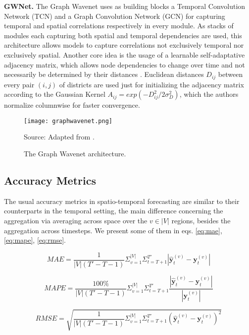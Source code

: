 \noindent
\textbf{GWNet.} The Graph Wavenet uses as building blocks a Temporal Convolution Network (TCN) and a Graph Convolution Network (GCN) for capturing temporal and spatial correlations respectively in every module.
As stacks of modules each capturing both spatial and temporal dependencies are used, this architecture allows models to capture correlations not exclusively temporal nor exclusively spatial.
Another core idea is the usage of a learnable self-adaptative adjacency matrix, which allows node dependencies to change over time and not necessarily be determined by their distances \cite{wu2019graphwavenet, liu2020intro}.
Euclidean distances $D_{ij}$ between every pair $(i,j)$ of districts are used just for initializing the adjacency matrix according to the Gaussian Kernel $A_{ij} = exp(-D_{ij}^2/2\sigma_{D}^2)$, which the authors normalize columnwise for faster convergence.
\begin{figure}[H]
	\centering
    \caption{The Graph Wavenet architecture.}
    \texttt{[image: graphwavenet.png]}  \\
    \raggedright
    Source: Adapted from \cite{wu2019graphwavenet}.
	\label{fig:graphwavenet}
\end{figure}

\subsection{Accuracy Metrics}

The usual accuracy metrics in spatio-temporal forecasting are similar to their counterparts in the temporal setting, the main difference concerning the aggregation via averaging across space over the $v \in |V|$ regions, besides the aggregation across timesteps.
We present some of them in eqs. \ref{eq:mae}, \ref{eq:mape}, \ref{eq:rmse}.

\begin{equation}\label{eq:mae_multi}
    MAE = \frac{1}{|V|(T'-T-1)} \Sigma_{v=1}^{|V|} \Sigma_{t=T+1}^{T'} | \bm{\hat{y}}^{(v)}_{t} - \bm{y}_{t}^{(v)} |
\end{equation}


\begin{equation}\label{eq:mape_multi}
    MAPE = \frac{100\%}{|V|(T'-T-1)}\Sigma_{v=1}^{|V|} \Sigma_{t=T+1}^{T'} \frac{ | \bm{\hat{y}}^{(v)}_{t} - \bm{y}_{t}^{(v)} | }{ |\bm{y}_{t}^{(v)}| }
\end{equation}


\begin{equation}\label{eq:rmse_multi}
    RMSE = \sqrt{ \frac{1}{|V|(T'-T-1)} \Sigma_{v=1}^{|V|} \Sigma_{t=T+1}^{T'} (\bm{\hat{y}}^{(v)}_{t} - \bm{y}_{t}^{(v)})^2 }
\end{equation}

